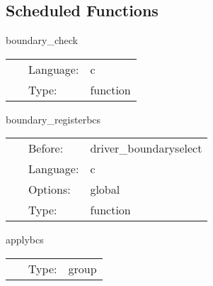 \documentclass{article}
\begin{document}
\subsection*{Scheduled Functions}
\vspace{5mm}


\hspace{5mm} boundary\_check 

\hspace{5mm}{\it check dimension of grid variables } 


\hspace{5mm}

 \begin{tabular*}{160mm}{cll} 
~ & Language:  & c \\ 
~ & Type:  & function \\ 
\end{tabular*} 


\vspace{5mm}


\hspace{5mm} boundary\_registerbcs 

\hspace{5mm}{\it register boundary conditions that this thorn provides } 


\hspace{5mm}

 \begin{tabular*}{160mm}{cll} 
~ & Before:  & driver\_boundaryselect \\ 
~ & Language:  & c \\ 
~ & Options:  & global \\ 
~ & Type:  & function \\ 
\end{tabular*} 


\vspace{5mm}

\noindent {\bf } 

\hspace{5mm} applybcs 

\hspace{5mm}{\it apply boundary conditions } 


\hspace{5mm}

 \begin{tabular*}{160mm}{cll} 
~ & Type:  & group \\ 
\end{tabular*} 
\end{document}
